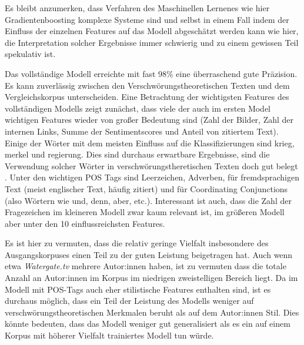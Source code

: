 Es bleibt anzumerken, dass Verfahren des Maschinellen Lernenes wie hier Gradientenboosting komplexe Systeme sind und selbst in einem Fall indem der Einfluss der einzelnen Features auf das Modell abgeschätzt werden kann wie hier, die Interpretation solcher Ergebnisse immer schwierig und zu einem gewissen Teil spekulativ ist.


Das vollständige Modell erreichte mit fast 98\% eine überraschend gute Präzision.
Es kann zuverlässig zwischen den Verschwörungstheoretischen Texten und dem Vergleichskorpus unterscheiden.
Eine Betrachtung der wichtigsten Features des vollständigen Modells zeigt zunächst, dass viele der auch im ersten Model wichtigen Features wieder von großer Bedeutung sind (Zahl der Bilder, Zahl der internen Links, Summe der Sentimentscores und Anteil von zitiertem Text).
Einige der Wörter mit dem meisten Einfluss auf die Klassifizierungen sind krieg, merkel und regierung.
Dies sind durchaus erwartbare Ergebnisse, sind die Verwendung solcher Wörter in verschwörungstheretischen Texten doch gut belegt .
Unter den wichtigen POS Tags sind Leerzeichen, Adverben, für fremdsprachigen Text (meist englischer Text, häufig zitiert) und für Coordinating Conjunctions (also Wörtern wie und, denn, aber, etc.).
Interessant ist auch, dass die Zahl der Fragezeichen im kleineren Modell zwar kaum relevant ist, im größeren Modell aber unter den 10 einflussreichsten Features.

Es ist hier zu vermuten, dass die relativ geringe Vielfalt insbesondere des Ausgangskorpuses einen Teil zu der guten Leistung beigetragen hat.
Auch wenn etwa \textit{Watergate.tv} mehrere Autor:innen haben, ist zu vermuten dass die totale Anzahl an Autor:innen im Korpus im niedrigen zweistelligen Bereich liegt.
Da im Modell mit POS-Tags auch eher stilistische Features enthalten sind, ist es durchaus möglich, dass ein Teil der Leistung des Modells weniger auf verschwörungstheoretischen Merkmalen beruht als auf dem Autor:innen Stil.
Dies könnte bedeuten, dass das Modell weniger gut generalisiert als es ein auf einem Korpus mit höherer Vielfalt trainiertes Modell tun würde.

